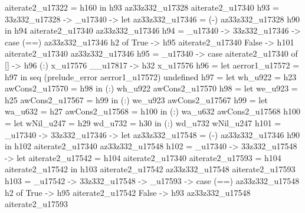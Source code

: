                                      aiterate2_u17322 = h160
                                   in h93 az33z332_u17328 aiterate2_u17340
         h93 = \az33z332_u17328 -> _u17340 -> let
                                                          az33z332_u17346 = (-) az33z332_u17328 h90
                                                        in h94 aiterate2_u17340 az33z332_u17346
         h94 = _u17340 -> \az33z332_u17346 -> case (==) az33z332_u17346 h2 of
                                                          True -> h95 aiterate2_u17340
                                                          False -> h101 aiterate2_u17340 az33z332_u17346
         h95 = _u17340 -> case aiterate2_u17340 of
                                      [] -> h96
                                      (:) x_u17576 __u17817 -> h32 x_u17576
         h96 = let aerror1_u17572 = h97
               in seq (prelude_error aerror1_u17572) undefined
         h97 = let
                 wh_u922 = h23
                 awCons2_u17570 = h98
               in (:) wh_u922 awCons2_u17570
         h98 = let
                 we_u923 = h25
                 awCons2_u17567 = h99
               in (:) we_u923 awCons2_u17567
         h99 = let
                 wa_u632 = h27
                 awCons2_u17568 = h100
               in (:) wa_u632 awCons2_u17568
         h100 = let
                  wNil_u247 = h29
                  wd_u732 = h30
                in (:) wd_u732 wNil_u247
         h101 = _u17340 -> \az33z332_u17346 -> let
                                                           az33z332_u17548 = (-) az33z332_u17346 h90
                                                         in h102 aiterate2_u17340 az33z332_u17548
         h102 = _u17340 -> \az33z332_u17548 -> let
                                                           aiterate2_u17542 = h104 aiterate2_u17340
                                                           aiterate2_u17593 = h104 aiterate2_u17542
                                                         in h103 aiterate2_u17542 az33z332_u17548 aiterate2_u17593
         h103 = _u17542 -> \az33z332_u17548 -> _u17593 -> case (==) az33z332_u17548 h2 of
                                                                                True ->
                                                                                  h95 aiterate2_u17542
                                                                                False ->
                                                                                  h93 az33z332_u17548 aiterate2_u17593
